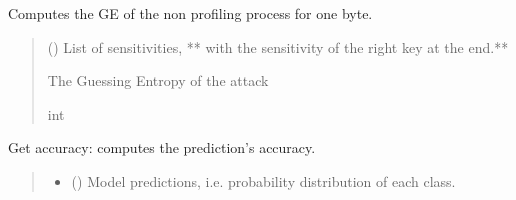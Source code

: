 \documentclass[letterpaper,10pt,english]{sphinxmanual}
\begin{document}
\begin{fulllineitems}
\begin{fulllineitems}
\label{\detokenize{MLSCAlib.Attacks:MLSCAlib.Attacks.attack.Attack.get_GE_from_sensitivity}}
\pysigstartsignatures
{}
\pysigstopsignatures
\sphinxAtStartPar
Computes the GE of the non profiling process for one byte.
\begin{quote}\begin{description}
\sphinxAtStartPar
{} (\sphinxstyleliteralemphasis{\sphinxupquote{{[}}}\sphinxstyleliteralemphasis{\sphinxupquote{{[}}}\sphinxstyleliteralemphasis{\sphinxupquote{{]}}}\sphinxstyleliteralemphasis{\sphinxupquote{{]}}}) \textendash{} List of sensitivities, ** with the sensitivity of the right key at the end.**

\sphinxAtStartPar
The Guessing Entropy of the attack

\sphinxAtStartPar
int

\end{description}\end{quote}

\end{fulllineitems}


\begin{fulllineitems}
\label{\detokenize{MLSCAlib.Attacks:MLSCAlib.Attacks.attack.Attack.get_accuracy}}
\pysigstartsignatures
{}
\pysigstopsignatures
\sphinxAtStartPar
Get accuracy: computes the prediction’s accuracy.
\begin{quote}\begin{description}
\begin{itemize}
\item {} 
\sphinxAtStartPar
{} (\sphinxstyleliteralemphasis{\sphinxupquote{{[}}}\sphinxstyleliteralemphasis{\sphinxupquote{{[}}}\sphinxstyleliteralemphasis{\sphinxupquote{{]}}}\sphinxstyleliteralemphasis{\sphinxupquote{{]}}}) \textendash{} Model predictions, i.e. probability distribution of each class.


\end{itemize}
\end{description}
\end{quote}
\end{fulllineitems}
\end{fulllineitems}
\end{document}
